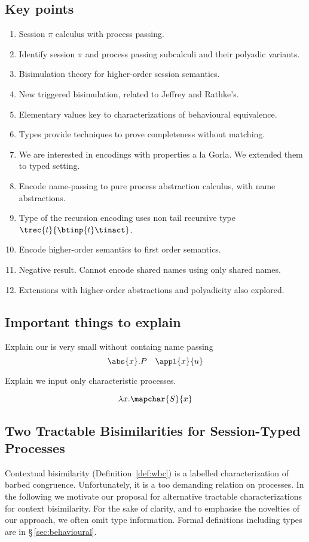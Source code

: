 \subsection{Key points}
\begin{enumerate}[1.]
	\item	Session $\pi$ calculus with process passing.
	\item	Identify session $\pi$ and process passing subcalculi and their polyadic variants.
	\item	Bisimulation theory for higher-order session semantics.
	\item	New triggered bisimulation, related to Jeffrey and Rathke's.
	\item   Elementary values key to characterizations of behavioural equivalence.
	\item	Types provide techniques to prove completeness without matching.
	\item	We are interested in encodings with properties a la Gorla. 
                We extended them to typed setting. 
	\item	Encode name-passing to pure process abstraction calculus, with name abstractions.
	\item	Type of the recursion encoding uses non tail recursive type $\trec{t}{\btinp{t} \tinact}$.
	\item	Encode higher-order semantics to first order semantics.
	\item	Negative result. Cannot encode shared names using only shared names.
	\item   Extensions with higher-order abstractions and polyadicity also explored.
\end{enumerate}

\smallskip 

\subsection{Important things to explain}
Explain our \HO is very small without containg name passing 
\[ 
\abs{x}.P \quad \appl{x}{u}
\]

Explain we input only characteristic processes.  

\[
\lambda x.\mapchar{S}{x}
\]


\subsection{Two Tractable Bisimilarities for Session-Typed Processes}
\noi 
Contextual bisimilarity (Definition~\ref{def:wbc}) is a labelled characterization of barbed congruence. 
Unfortunately, it is a too demanding relation on processes. In the following we motivate our
proposal for alternative tractable characterizations for context bisimilarity. 
For the sake of clarity, and to emphasise the novelties of our approach, 
we often omit type information. Formal definitions including types are in \S\,\ref{sec:behavioural}.

